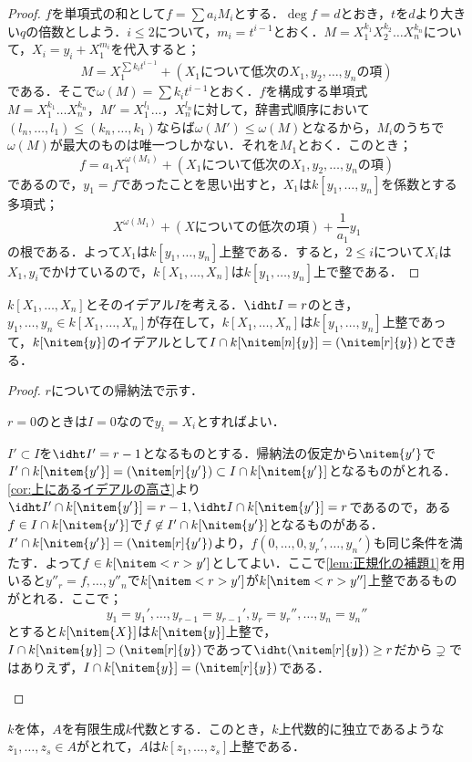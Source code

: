\begin{proof}
	$f$を単項式の和として$f=\sum a_iM_i$とする．$\deg f=d$とおき，$t$を$d$より大きい$q$の倍数としよう．$i\leq2$について，$m_i=t^{i-1}$とおく．$M=X_1^{k_1}X_2^{k_2}\dots X_n^{k_n}$について，$X_i=y_i+X_1^{m_i}$を代入すると；
	\[M=X_1^{\sum k_it^{i-1}}+(X_1\text{について低次の}X_1,y_2,\dots,y_n\text{の項})\]
	である．そこで$\omega(M)=\sum k_it^{i-1}$とおく．$f$を構成する単項式$M=X_1^{k_1}\dots X_n^{k_n}，M'=X_1^{l_1}\dots，X_n^{l_n}$に対して，辞書式順序において$(l_n,\dots,l_1)\leq (k_n,\dots,k_1)$ならば$\omega(M')\leq\omega(M)$となるから，$M_i$のうちで$\omega(M)$が最大のものは唯一つしかない．それを$M_1$とおく．このとき；
	\[f=a_1X_1^{\omega(M_1)}+(X_1\text{について低次の}X_1,y_2,\dots,y_n\text{の項})\]
	であるので，$y_1=f$であったことを思い出すと，$X_1$は$k[y_1,\dots,y_n]$を係数とする多項式；
	\[X^{\omega(M_1)}+(X\text{についての低次の項})+\frac{1}{a_1}y_1\]
	の根である．よって$X_1$は$k[y_1,\dots,y_n]$上整である．すると，$2\leq i$について$X_i$は$X_1,y_i$でかけているので，$k[X_1,\dots,X_n]$は$k[y_1,\dots,y_n]$上で整である．
\end{proof}

\begin{thm}[多項式環の正規化定理]
	$k[X_1,\dots,X_n]$とそのイデアル$I$を考える．$\idht I=r$のとき，$y_1,\dots,y_n\in k[X_1,\dots,X_n]$が存在して，$k[X_1,\dots,X_n]$は$k[y_1,\dots,y_n]$上整であって，$k[\nitem{y}]$のイデアルとして$I\cap k[\nitem[n]{y}]=(\nitem[r]{y})$とできる．
\end{thm}

\begin{proof}
	$r$についての帰納法で示す．
	
	\begin{step}\item $r=0$のときは$I=0$なので$y_i=X_i$とすればよい．
	
	\item	$I'\subset I$を$\idht I'=r-1$となるものとする．帰納法の仮定から$\nitem{y'}$で$I'\cap k[\nitem{y'}]=(\nitem[r]{y'})\subset I\cap k[\nitem{y'}]$となるものがとれる．\ref{cor:上にあるイデアルの高さ}より$\idht I'\cap k[\nitem{y'}]=r-1,\idht I\cap k[\nitem{y'}]=r$であるので，ある$f\in I\cap k[\nitem{y'}]$で$f\not\in I'\cap k[\nitem{y'}]$となるものがある．$I'\cap k[\nitem{y'}]=(\nitem[r]{y'})$より，$f(0,\dots,0,y_r',\dots,y_n')$も同じ条件を満たす．よって$f\in k[\nitem<r>{y'}]$としてよい．ここで\ref{lem:正規化の補題1}を用いると$y''_r=f,\dots,y''_n$で$k[\nitem<r>{y'}]$が$k[\nitem<r>{y''}]$上整であるものがとれる．ここで；
	\[y_1=y_1',\dots,y_{r-1}=y_{r-1}', y_r=y_r'',\dots,y_n=y_n''\]
	とすると$k[\nitem{X}]$は$k[\nitem{y}]$上整で，$I\cap k[\nitem{y}]\supset (\nitem[r]{y})$であって$\idht(\nitem[r]{y})\geq r$だから$\supsetneq$ではありえず，$I\cap k[\nitem{y}]=(\nitem[r]{y})$である．
	\end{step}
\end{proof}
\begin{thm}[Noetherの正規化定理]\label{thm:正規化定理}
	$k$を体，$A$を有限生成$k$代数とする．このとき，$k$上代数的に独立であるような$z_1,\dots,z_s\in A$がとれて，$A$は$k[z_1,\dots,z_s]$上整である．
\end{thm}

